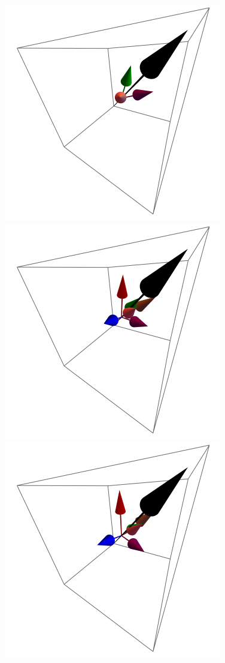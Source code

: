 \documentclass{article}
\begin{document}
\begin{figure}[ht]
\centering
\includegraphics[scale=0.4]{HVariedData/Pictures/111Dec1.png}
\includegraphics[scale=0.4]{HVariedData/Pictures/111Dec95.png}
\includegraphics[scale=0.4]{HVariedData/Pictures/111Dec99.png}

\end{figure}
\end{document}
